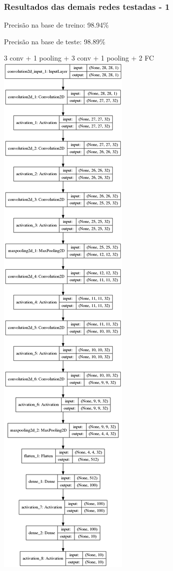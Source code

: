 \documentclass[tikz,11pt]{beamer}
\begin{document}
\begin{frame}
	\frametitle{Resultados das demais redes testadas - 1 }
	\centering
	\par Precisão na base de treino: 98.94\%
	\par Precisão na base de teste: 98.89\%
	\par 3 conv + 1 pooling + 3 conv + 1 pooling + 2 FC 
	\\
	\includegraphics[height=.7\paperheight]{images/resultados/network_1/model}
\end{frame}
\end{document}
